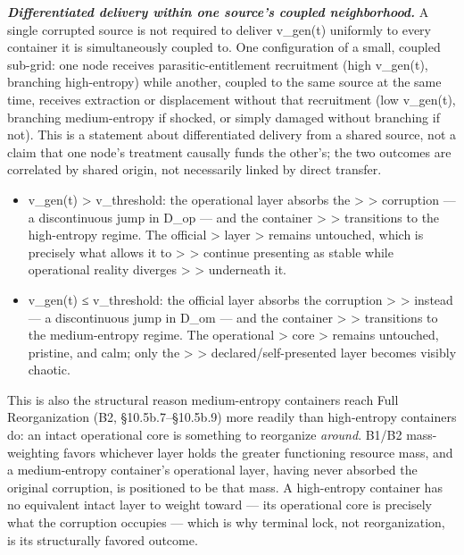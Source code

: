 \documentclass[
]{article}
\begin{document}
\emph{\textbf{Differentiated delivery within one source's coupled
neighborhood.}} A single corrupted source is not required to deliver
v\_gen(t) uniformly to every container it is simultaneously coupled to.
One configuration of a small, coupled sub-grid: one node receives
parasitic-entitlement recruitment (high v\_gen(t), branching
high-entropy) while another, coupled to the same source at the same
time, receives extraction or displacement without that recruitment (low
v\_gen(t), branching medium-entropy if shocked, or simply damaged
without branching if not). This is a statement about differentiated
delivery from a shared source, not a claim that one node's treatment
causally funds the other's; the two outcomes are correlated by shared
origin, not necessarily linked by direct transfer.

\begin{itemize}
\item
  v\_gen(t) \textgreater{} v\_threshold: the operational layer absorbs
  the \textgreater{} \textgreater{} corruption --- a discontinuous jump
  in D\_op --- and the container \textgreater{} \textgreater{}
  transitions to the high-entropy regime. The official \textgreater{}
  layer \textgreater{} remains untouched, which is precisely what allows
  it to \textgreater{} \textgreater{} continue presenting as stable
  while operational reality diverges \textgreater{} \textgreater{}
  underneath it.
\item
  v\_gen(t) ≤ v\_threshold: the official layer absorbs the corruption
  \textgreater{} \textgreater{} instead --- a discontinuous jump in
  D\_om --- and the container \textgreater{} \textgreater{} transitions
  to the medium-entropy regime. The operational \textgreater{} core
  \textgreater{} remains untouched, pristine, and calm; only the
  \textgreater{} \textgreater{} declared/self-presented layer becomes
  visibly chaotic.
\end{itemize}

This is also the structural reason medium-entropy containers reach Full
Reorganization (B2, §10.5b.7--§10.5b.9) more readily than high-entropy
containers do: an intact operational core is something to reorganize
\emph{around}. B1/B2 mass-weighting favors whichever layer holds the
greater functioning resource mass, and a medium-entropy container's
operational layer, having never absorbed the original corruption, is
positioned to be that mass. A high-entropy container has no equivalent
intact layer to weight toward --- its operational core is precisely what
the corruption occupies --- which is why terminal lock, not
reorganization, is its structurally favored outcome.
\end{document}
